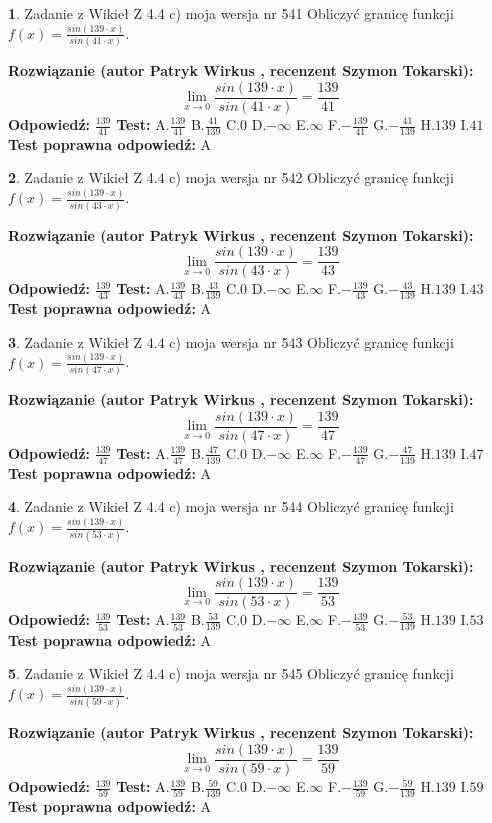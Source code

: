 \documentclass[12pt, a4paper]{article}
\theoremstyle{definition} %
\newtheorem{zad}{}
\newcommand{\zadStart}[1]{\begin{zad}#1\newline}
\newcommand{\zadStop}{\end{zad}}
\newcommand{\rozwStart}[2]{\noindent \textbf{Rozwiązanie (autor #1 , recenzent #2): }\newline}
\newcommand{\rozwStop}{\newline}
\newcommand{\odpStart}{\noindent \textbf{Odpowiedź:}\newline}
\newcommand{\odpStop}{\newline}
\newcommand{\testStart}{\noindent \textbf{Test:}\newline}
\newcommand{\testStop}{\newline}
\newcommand{\kluczStart}{\noindent \textbf{Test poprawna odpowiedź:}\newline}
\newcommand{\kluczStop}{\newline}
\begin{document}
\zadStart{Zadanie z Wikieł Z 4.4 c) moja wersja nr 541}
Obliczyć granicę funkcji $f(x)=\frac{sin(139\cdot x)}{sin(41\cdot x)}$.
\zadStop
\rozwStart{Patryk Wirkus}{Szymon Tokarski}
$$\lim\limits_{x\to 0}\frac{sin(139\cdot x)}{sin(41\cdot x)}=
\frac{139}{41}$$
\rozwStop
\odpStart
$\frac{139}{41}$
\odpStop
\testStart
A.$\frac{139}{41}$
B.$\frac{41}{139}$
C.$0$
D.$-\infty$
E.$\infty$
F.$-\frac{139}{41}$
G.$-\frac{41}{139}$
H.$139$
I.$41$
\testStop
\kluczStart
A
\kluczStop



\zadStart{Zadanie z Wikieł Z 4.4 c) moja wersja nr 542}
Obliczyć granicę funkcji $f(x)=\frac{sin(139\cdot x)}{sin(43\cdot x)}$.
\zadStop
\rozwStart{Patryk Wirkus}{Szymon Tokarski}
$$\lim\limits_{x\to 0}\frac{sin(139\cdot x)}{sin(43\cdot x)}=
\frac{139}{43}$$
\rozwStop
\odpStart
$\frac{139}{43}$
\odpStop
\testStart
A.$\frac{139}{43}$
B.$\frac{43}{139}$
C.$0$
D.$-\infty$
E.$\infty$
F.$-\frac{139}{43}$
G.$-\frac{43}{139}$
H.$139$
I.$43$
\testStop
\kluczStart
A
\kluczStop



\zadStart{Zadanie z Wikieł Z 4.4 c) moja wersja nr 543}
Obliczyć granicę funkcji $f(x)=\frac{sin(139\cdot x)}{sin(47\cdot x)}$.
\zadStop
\rozwStart{Patryk Wirkus}{Szymon Tokarski}
$$\lim\limits_{x\to 0}\frac{sin(139\cdot x)}{sin(47\cdot x)}=
\frac{139}{47}$$
\rozwStop
\odpStart
$\frac{139}{47}$
\odpStop
\testStart
A.$\frac{139}{47}$
B.$\frac{47}{139}$
C.$0$
D.$-\infty$
E.$\infty$
F.$-\frac{139}{47}$
G.$-\frac{47}{139}$
H.$139$
I.$47$
\testStop
\kluczStart
A
\kluczStop



\zadStart{Zadanie z Wikieł Z 4.4 c) moja wersja nr 544}
Obliczyć granicę funkcji $f(x)=\frac{sin(139\cdot x)}{sin(53\cdot x)}$.
\zadStop
\rozwStart{Patryk Wirkus}{Szymon Tokarski}
$$\lim\limits_{x\to 0}\frac{sin(139\cdot x)}{sin(53\cdot x)}=
\frac{139}{53}$$
\rozwStop
\odpStart
$\frac{139}{53}$
\odpStop
\testStart
A.$\frac{139}{53}$
B.$\frac{53}{139}$
C.$0$
D.$-\infty$
E.$\infty$
F.$-\frac{139}{53}$
G.$-\frac{53}{139}$
H.$139$
I.$53$
\testStop
\kluczStart
A
\kluczStop



\zadStart{Zadanie z Wikieł Z 4.4 c) moja wersja nr 545}
Obliczyć granicę funkcji $f(x)=\frac{sin(139\cdot x)}{sin(59\cdot x)}$.
\zadStop
\rozwStart{Patryk Wirkus}{Szymon Tokarski}
$$\lim\limits_{x\to 0}\frac{sin(139\cdot x)}{sin(59\cdot x)}=
\frac{139}{59}$$
\rozwStop
\odpStart
$\frac{139}{59}$
\odpStop
\testStart
A.$\frac{139}{59}$
B.$\frac{59}{139}$
C.$0$
D.$-\infty$
E.$\infty$
F.$-\frac{139}{59}$
G.$-\frac{59}{139}$
H.$139$
I.$59$
\testStop
\kluczStart
A
\kluczStop
\end{document}
